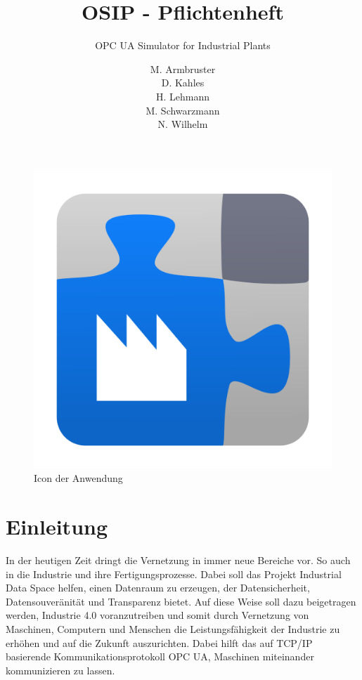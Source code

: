 \documentclass[parskip=full]{scrartcl}
\title{OSIP - Pflichtenheft}
\subtitle{\gls{OPC UA} Simulator for Industrial Plants}
\author{
    M. Armbruster\\
    D. Kahles\\
    H. Lehmann\\
    M. Schwarzmann\\
    N. Wilhelm
}
\begin{document}
\maketitle
\begin{figure}[h]
  \centering
  \includegraphics[scale=0.5]{../icon.png}
  \caption{Icon der Anwendung}
\end{figure}
\pagebreak
\tableofcontents
\pagebreak

\section{Einleitung}
In der heutigen Zeit dringt die Vernetzung in immer neue Bereiche vor. So auch in die Industrie und ihre Fertigungsprozesse.
Dabei soll das Projekt \gls{Industrial Data Space} helfen, einen Datenraum zu erzeugen, der Datensicherheit, Datensouveränität und
Transparenz bietet. Auf diese Weise soll dazu beigetragen werden, Industrie 4.0 voranzutreiben und somit durch Vernetzung von
Maschinen, Computern und Menschen die Leistungsfähigkeit der Industrie zu erhöhen und auf die Zukunft auszurichten.
Dabei hilft das auf \gls{TCP/IP} basierende Kommunikationsprotokoll \gls{OPC UA}, Maschinen miteinander kommunizieren zu lassen.
\end{document}
